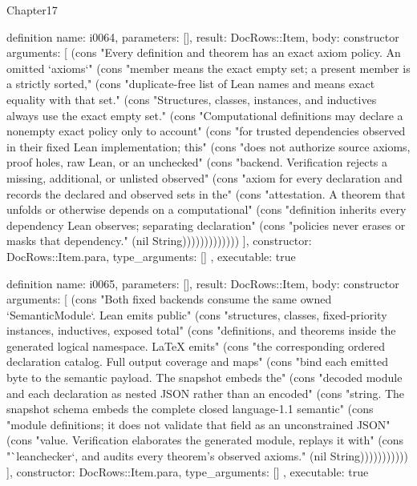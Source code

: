 \begin{lexlean}{Chapter17}
\begin{semanticmodule}
definition{
  name: i0064,
  parameters: [],
  result: DocRows::Item,
  body: constructor{
    arguments: [
      (cons "Every definition and theorem has an exact axiom policy. An omitted `axioms`" (cons "member means the exact empty set; a present member is a strictly sorted," (cons "duplicate-free list of Lean names and means exact equality with that set." (cons "Structures, classes, instances, and inductives always use the exact empty set." (cons "Computational definitions may declare a nonempty exact policy only to account" (cons "for trusted dependencies observed in their fixed Lean implementation; this" (cons "does not authorize source axioms, proof holes, raw Lean, or an unchecked" (cons "backend. Verification rejects a missing, additional, or unlisted observed" (cons "axiom for every declaration and records the declared and observed sets in the" (cons "attestation. A theorem that unfolds or otherwise depends on a computational" (cons "definition inherits every dependency Lean observes; separating declaration" (cons "policies never erases or masks that dependency." (nil String)))))))))))))
    ],
    constructor: DocRows::Item.para,
    type_arguments: []
  },
  executable: true
}

definition{
  name: i0065,
  parameters: [],
  result: DocRows::Item,
  body: constructor{
    arguments: [
      (cons "Both fixed backends consume the same owned `SemanticModule`. Lean emits public" (cons "structures, classes, fixed-priority instances, inductives, exposed total" (cons "definitions, and theorems inside the generated logical namespace. LaTeX emits" (cons "the corresponding ordered declaration catalog. Full output coverage and maps" (cons "bind each emitted byte to the semantic payload. The snapshot embeds the" (cons "decoded module and each declaration as nested JSON rather than an encoded" (cons "string. The snapshot schema embeds the complete closed language-1.1 semantic" (cons "module definitions; it does not validate that field as an unconstrained JSON" (cons "value. Verification elaborates the generated module, replays it with" (cons "`leanchecker`, and audits every theorem's observed axioms." (nil String)))))))))))
    ],
    constructor: DocRows::Item.para,
    type_arguments: []
  },
  executable: true
}


\end{semanticmodule}
\end{lexlean}
